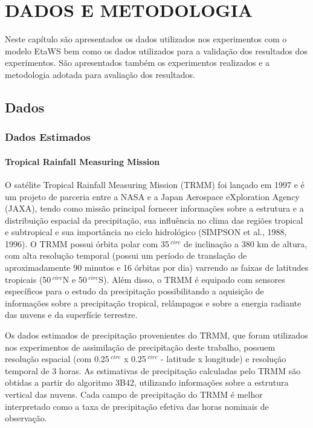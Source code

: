 \hypertarget{estilo:capitulo}{}
\chapter{DADOS E METODOLOGIA}

Neste capítulo são apresentados os dados utilizados nos experimentos com o modelo EtaWS bem como os dados utilizados para a validação dos resultados dos experimentos. São apresentados também os experimentos realizados e a metodologia adotada para avaliação dos resultados.

\section{Dados}
\label{ss:dados}

\subsection{Dados Estimados}

\subsubsection{Tropical Rainfall Measuring Mission}

O satélite Tropical Rainfall Measuring Mission (TRMM) foi lançado em 1997 e é um projeto de parceria entre a NASA e a Japan Aerospace eXploration Agency (JAXA), tendo como missão principal  fornecer informações sobre a estrutura e a distribuição espacial da precipitação, sua influência no clima das regiões tropical e subtropical e sua importância no ciclo hidrológico (SIMPSON et al., 1988, 1996).
O TRMM possui órbita polar com 35$\,^{circ}$ de inclinação a 380 km de altura, com alta resolução temporal (possui um período de translação de aproximadamente 90 minutos e 16 órbitas por dia) varrendo as faixas de latitudes tropicais (50$\,^{circ}$N e 50$\,^{circ}$S). Além disso, o TRMM é equipado com sensores específicos para o estudo da precipitação possibilitando a aquisição de informações sobre a precipitação tropical, relâmpagos e sobre a energia radiante das nuvens e da superfície terrestre.

Os dados estimados de precipitação provenientes do TRMM, que foram utilizados nos experimentos de assimilação de precipitação deste trabalho, possuem resolução espacial (com 0.25$\,^{circ}$ x 0.25$\,^{circ}$ - latitude x longitude) e resolução temporal de 3 horas. As estimativas de precipitação calculadas pelo TRMM são obtidas a partir do algoritmo 3B42, utilizando informações sobre a estrutura vertical das nuvens. Cada campo de precipitação do TRMM é melhor interpretado como a taxa de precipitação efetiva das horas nominais de observação.

